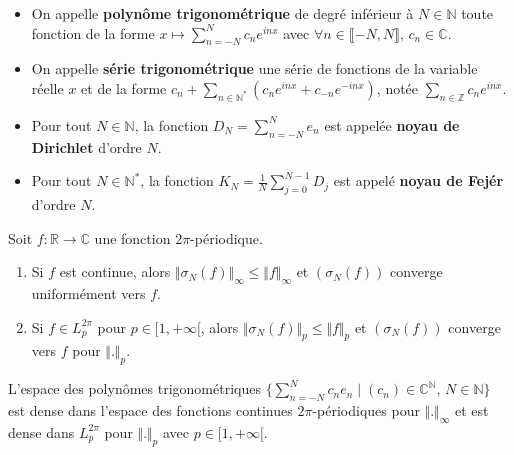   \begin{definition}
    \begin{itemize}
      \item On appelle \textbf{polynôme trigonométrique} de degré inférieur à $N \in \mathbb{N}$ toute fonction de la forme $x \mapsto \sum_{n=-N}^{N} c_n e^{inx}$ avec $\forall n \in \llbracket -N, N \rrbracket$, $c_n \in \mathbb{C}$.
      \item On appelle \textbf{série trigonométrique} une série de fonctions de la variable réelle $x$ et de la forme $c_n + \sum_{n \in \mathbb{N}^*} (c_n e^{inx} + c_{-n} e^{-inx})$, notée $\sum_{n \in \mathbb{Z}} c_n e^{inx}$.
    \end{itemize}
  \end{definition}


  \begin{example}
    \begin{itemize}
      \item Pour tout $N \in \mathbb{N}$, la fonction $D_N = \sum_{n=-N}^{N} e_n$ est appelée \textbf{noyau de Dirichlet} d'ordre $N$.
      \item Pour tout $N \in \mathbb{N}^*$, la fonction $K_N = \frac{1}{N} \sum_{j=0}^{N-1} D_j$ est appelé \textbf{noyau de Fejér} d'ordre $N$.
    \end{itemize}
  \end{example}


  \begin{theorem}
    Soit $f : \mathbb{R} \rightarrow \mathbb{C}$ une fonction $2\pi$-périodique.
    \begin{enumerate}[label={\bfseries(\roman*)}]
      \item Si $f$ est continue, alors $\Vert \sigma_N(f) \Vert_\infty \leq \Vert f \Vert_\infty$ et $(\sigma_N(f))$ converge uniformément vers $f$.
      \item Si $f \in L_p^{2\pi}$ pour $p \in [1,+\infty[$, alors $\Vert \sigma_N(f) \Vert_p \leq \Vert f \Vert_p$ et $(\sigma_N(f))$ converge vers $f$ pour $\Vert . \Vert_p$.
    \end{enumerate}
  \end{theorem}

  \begin{corollary}
    L'espace des polynômes trigonométriques $\{ \sum_{n=-N}^N c_n e_n \mid (c_n) \in \mathbb{C}^{\mathbb{N}}, \, N \in \mathbb{N} \}$ est dense dans l'espace des fonctions continues $2\pi$-périodiques pour $\Vert . \Vert_\infty$ et est dense dans $L_p^{2\pi}$ pour $\Vert . \Vert_p$ avec $p \in [1,+\infty[$.
  \end{corollary}

